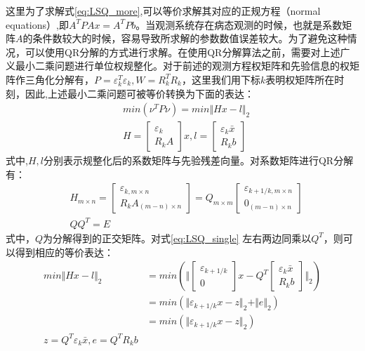 这里为了求解式\eqref{eq:LSQ_more},可以等价求解其对应的正规方程（normal equations）,即\(A^{T}PAx=A^{T}Pb\)。当观测系统存在病态观测的时候，也就是系数矩阵\(A\)的条件数较大的时候，容易导致所求解的参数数值误差较大。为了避免这种情况，可以使用QR分解的方式进行求解。在使用QR分解算法之前，需要对上述广义最小二乘问题进行单位权规整化。对于前述的观测方程权矩阵和先验信息的权矩阵作三角化分解有，\(P=\varepsilon_{k}^{T}\varepsilon_{k},W=R_{k}^TR_{k}\)，这里我们用下标\(k\)表明权矩阵所在时刻，因此,上述最小二乘问题可被等价转换为下面的表达：
\begin{equation}
	\begin{aligned}
	& min(\nu^{T}P\nu) =min \Vert Hx-l \Vert_{2} \\
	& H = 
	\begin{bmatrix}
		\varepsilon_{k}\\
		R_{k}A 
	\end{bmatrix}x ,
	l = 
	\begin{bmatrix}
		\varepsilon_{k}\bar{x} \\
		R_{k}b 
	\end{bmatrix}
	\end{aligned}
	\label{eq:LSQ_single}	
\end{equation}
式中,\(H,l\)分别表示规整化后的系数矩阵与先验残差向量。对系数矩阵进行QR分解有：
\begin{equation}
	\begin{aligned}
		& H_{m \times n}=
		\begin{bmatrix}
		\varepsilon_{k,m \times n}\\
		R_{k}A_{(m-n) \times n }
		\end{bmatrix} = 
		Q_{m \times m}
		\begin{bmatrix}
		\varepsilon_{k+1/k,m \times n}\\
		0_{(m-n) \times n}
		\end{bmatrix} \\ 
		& QQ^{T}=E
	\end{aligned}
	\label{eq:QR_factor}
\end{equation}
式中，\(Q\)为分解得到的正交矩阵。对式\eqref{eq:LSQ_single} 左右两边同乘以\(Q^{T}\)，则可以得到相应的等价表达：
\begin{equation}
	\begin{aligned}
		min \Vert Hx-l \Vert_{2} & = min(\Vert
		\begin{bmatrix}
			\varepsilon_{k+1/k} \\
			0
		\end{bmatrix} x-Q^{T}
		\begin{bmatrix}
			\varepsilon_{k}\bar{x} \\
			R_{k}b 
		\end{bmatrix}
		 \Vert _{2})\\
		& = min(\Vert \varepsilon_{k+1/k}x - z \Vert_{2} +
			\Vert e \Vert_{2}
		)\\		
		& = min(\Vert \varepsilon_{k+1/k}x - z \Vert_{2}) \\
		z = Q^{T}\varepsilon_{k}\bar{x},
		e= Q^{T}R_{k}b
	\end{aligned} 
	\label{eq:SRIF_meqsuare_update}
\end{equation}
